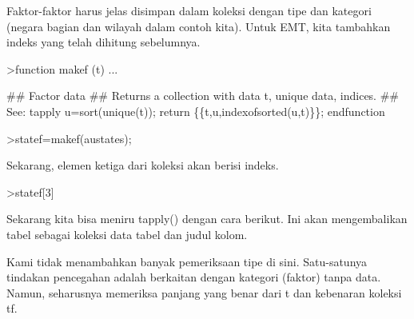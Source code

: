 \documentclass[a4paper,10pt]{article}
\begin{document}
\begin{eulernotebook}
\begin{eulercomment}
\begin{eulercomment}
\begin{eulercomment}
\begin{eulercomment}
\begin{eulercomment}
Faktor-faktor harus jelas disimpan dalam koleksi dengan tipe dan
kategori (negara bagian dan wilayah dalam contoh kita). Untuk EMT,
kita tambahkan indeks yang telah dihitung sebelumnya.
\end{eulercomment}
\begin{eulerprompt}
>function makef (t) ...
\end{eulerprompt}
\begin{eulerudf}
  ## Factor data
  ## Returns a collection with data t, unique data, indices.
  ## See: tapply
  u=sort(unique(t));
  return \{\{t,u,indexofsorted(u,t)\}\};
  endfunction
\end{eulerudf}
\begin{eulerprompt}
>statef=makef(austates);
\end{eulerprompt}
\begin{eulercomment}
Sekarang, elemen ketiga dari koleksi akan berisi indeks.
\end{eulercomment}
\begin{eulerprompt}
>statef[3]
\end{eulerprompt}
\begin{euleroutput}
  [6,  5,  4,  2,  2,  3,  8,  8,  4,  7,  2,  7,  4,  4,  5,  6,  5,  3,
  8,  7,  4,  2,  2,  8,  5,  1,  2,  7,  7,  1]
\end{euleroutput}
\begin{eulercomment}
Sekarang kita bisa meniru tapply() dengan cara berikut. Ini akan
mengembalikan tabel sebagai koleksi data tabel dan judul kolom.
\end{eulercomment}
\begin{eulercomment}
Kami tidak menambahkan banyak pemeriksaan tipe di sini. Satu-satunya
tindakan pencegahan adalah berkaitan dengan kategori (faktor) tanpa
data. Namun, seharusnya memeriksa panjang yang benar dari t dan
kebenaran koleksi tf.


\end{eulercomment}
\end{eulercomment}
\end{eulercomment}
\end{eulercomment}
\end{eulercomment}
\end{eulernotebook}
\end{document}
